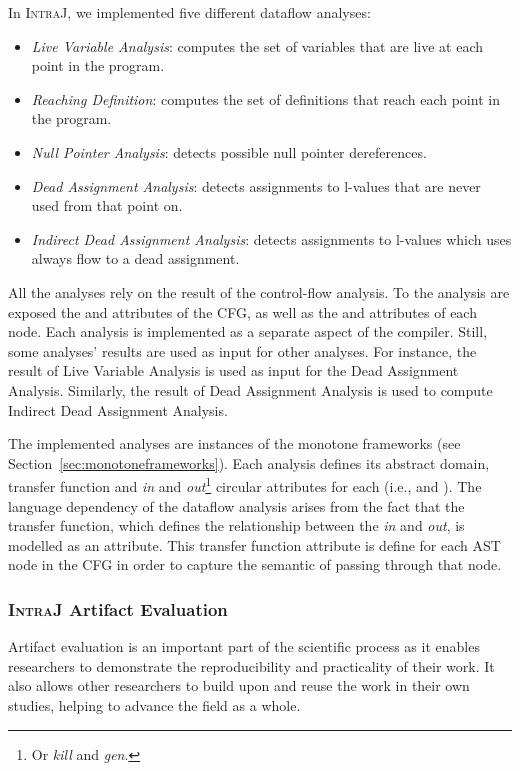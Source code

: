 In \textsc{IntraJ}, we implemented five different dataflow analyses:
\begin{itemize}
  \item \emph{Live Variable Analysis}: computes the set of variables that are live at each point in the program.
  \item \emph{Reaching Definition}: computes the set of definitions that reach each point in the program.
  \item \emph{Null Pointer Analysis}: detects possible null pointer dereferences.
  \item \emph{Dead Assignment Analysis}: detects assignments to l-values that are never used from that point on.
  \item \emph{Indirect Dead Assignment Analysis}: detects assignments to l-values which uses always flow to a dead assignment.
\end{itemize}
All the analyses rely on the result of the control-flow analysis. To the analysis are exposed
the  and  attributes of the CFG, as well as the  and 
attributes of each node.
Each analysis is implemented as a separate aspect of the compiler.
Still, some analyses' results are used as input for other analyses. For instance,
the result of Live Variable Analysis is used as input for the Dead Assignment Analysis.
Similarly, the result of Dead Assignment Analysis is used to compute Indirect Dead Assignment Analysis.

The implemented analyses are instances of the monotone frameworks (see Section~\ref{sec:monotoneframeworks}).
Each analysis defines its abstract domain, transfer function and \emph{in} and
\emph{out}\footnote{Or \emph{kill} and \emph{gen}.} circular attributes for each  (i.e.,  and  ).
The language dependency of the dataflow analysis arises from the fact that the
transfer function, which defines the relationship between the \emph{in} and \emph{out},
is modelled as an attribute. This transfer function attribute is
define for each AST node in the CFG in order to capture the semantic of passing
through that node.


\subsubsection{\textsc{IntraJ} Artifact Evaluation}
Artifact evaluation is an important part of the scientific process as it enables
researchers to demonstrate the reproducibility and practicality of their work.
It also allows other researchers to build upon and reuse the work in their own
studies, helping to advance the field as a whole.


